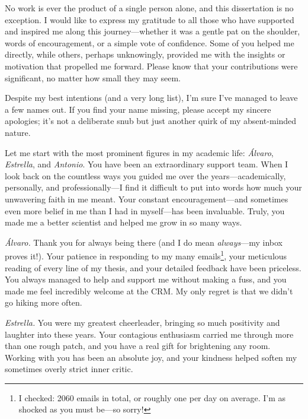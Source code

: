 
\begin{acknowledgements}      

No work is ever the product of a single person alone, and this dissertation is no exception. I would like to express my gratitude to all those who have supported and inspired me along this journey—whether it was a gentle pat on the shoulder, words of encouragement, or a simple vote of confidence. Some of you helped me directly, while others, perhaps unknowingly, provided me with the insights or motivation that propelled me forward. Please know that your contributions were significant, no matter how small they may seem.

Despite my best intentions (and a very long list), I'm sure I've managed to leave a few names out. If you find your name missing, please accept my sincere apologies; it's not a deliberate snub but just another quirk of my absent-minded nature.

Let me start with the most prominent figures in my academic life: \emph{Álvaro}, \emph{Estrella}, and \emph{Antonio}. You have been an extraordinary support team. When I look back on the countless ways you guided me over the years---academically, personally, and professionally---I find it difficult to put into words how much your unwavering faith in me meant. Your constant encouragement—and sometimes even more belief in me than I had in myself—has been invaluable. Truly, you made me a better scientist and helped me grow in so many ways.

\emph{Álvaro.} Thank you for always being there (and I do mean \emph{always}---my inbox proves it!). Your patience in responding to my many emails\footnote{I checked: \num{2060} emails in total, or roughly one per day on average. I'm as shocked as you must be---so sorry!}, your meticulous reading of every line of my thesis, and your detailed feedback have been priceless. You always managed to help and support me without making a fuss, and you made me feel incredibly welcome at the CRM. My only regret is that we didn't go hiking more often.

\emph{Estrella.} You were my greatest cheerleader, bringing so much positivity and laughter into these years. Your contagious enthusiasm carried me through more than one rough patch, and you have a real gift for brightening any room. Working with you has been an absolute joy, and your kindness helped soften my sometimes overly strict inner critic.


\end{acknowledgements}
